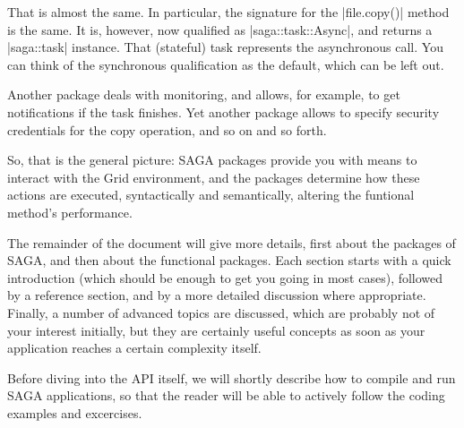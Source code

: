  That is almost the same.  In particular, the signature for the
  |file.copy()| method is the same.  It is, however, now qualified as
  |saga::task::Async|, and returns a |saga::task| instance.  That
  (stateful) task represents the asynchronous call.  You can think of
  the synchronous qualification as the default, which can be left out.

  Another \LF package deals with monitoring, and allows, for example,
  to get notifications if the task finishes.  Yet another \LF package
  allows to specify security credentials for the copy operation, and
  so on and so forth.

  So, that is the general picture: SAGA packages provide you with means
  to interact with the Grid environment, and the \LF packages
  determine how these actions are executed, syntactically and
  semantically, altering the funtional method's performance.


  The remainder of the document will give more details, first about
  the \LF packages of SAGA, and then about the functional packages. 
  Each section starts with a quick introduction (which should be enough to
  get you going in most cases), followed by a reference section, and
  by a more detailed discussion where appropriate.  Finally, a number
  of advanced topics are discussed, which are probably not of your interest
  initially, but they are certainly useful concepts as soon as your application
  reaches a certain complexity itself.

  Before diving into the API itself, we will shortly describe how to
  compile and run SAGA applications, so that the reader will be able
  to actively follow the coding examples and excercises.

